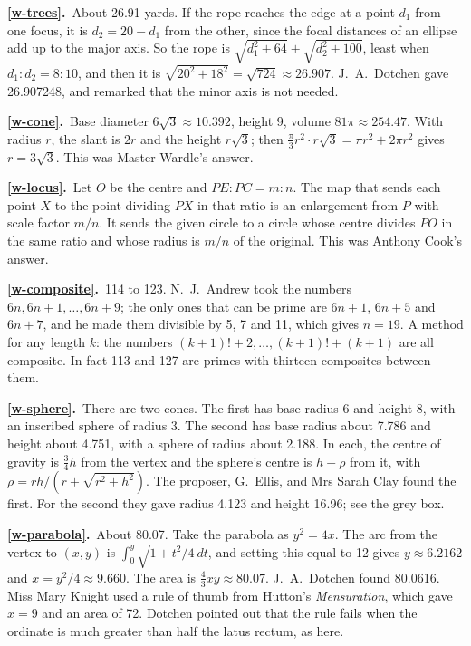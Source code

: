 \documentclass[11pt,a4paper]{article}
\newcommand{\ans}[2]{\par\smallskip\noindent\textbf{\ref{#1}.}\ #2}
\begin{document}
\ans{w-trees}{About 26.91 yards. If the rope reaches the edge at a point $d_1$ from one
focus, it is $d_2 = 20 - d_1$ from the other, since the focal distances of an ellipse add
up to the major axis. So the rope is $\sqrt{d_1^2 + 64} + \sqrt{d_2^2 + 100}$, least when
$d_1 : d_2 = 8 : 10$, and then it is $\sqrt{20^2 + 18^2} = \sqrt{724} \approx 26.907$.
J.~A.~Dotchen gave 26.907248, and remarked that the minor axis is not needed.}

\ans{w-cone}{Base diameter $6\sqrt3 \approx 10.392$, height 9, volume
$81\pi \approx 254.47$. With radius $r$, the slant is $2r$ and the height $r\sqrt3$; then
$\tfrac\pi3r^2\cdot r\sqrt3 = \pi r^2 + 2\pi r^2$ gives $r = 3\sqrt3$. This was Master
Wardle's answer.}

\ans{w-locus}{Let $O$ be the centre and $PE : PC = m : n$. The map that sends each point $X$
to the point dividing $PX$ in that ratio is an enlargement from $P$ with scale factor
$m/n$. It sends the given circle to a circle whose centre divides $PO$ in the same ratio
and whose radius is $m/n$ of the original. This was Anthony Cook's answer.}

\ans{w-composite}{114 to 123. N.~J.~Andrew took the numbers $6n, 6n+1, \dots, 6n+9$; the
only ones that can be prime are $6n+1$, $6n+5$ and $6n+7$, and he made them divisible by
5, 7 and 11, which gives $n = 19$. A method for any length $k$: the numbers
$(k+1)! + 2, \dots, (k+1)! + (k+1)$ are all composite. In fact 113 and 127 are primes with
thirteen composites between them.}

\ans{w-sphere}{There are two cones. The first has base radius 6 and height 8, with an
inscribed sphere of radius 3. The second has base radius about 7.786 and height about
4.751, with a sphere of radius about 2.188. In each, the centre of gravity is $\tfrac34h$
from the vertex and the sphere's centre is $h - \rho$ from it, with
$\rho = rh/(r + \sqrt{r^2+h^2})$. The proposer, G.~Ellis, and Mrs Sarah Clay found the
first. For the second they gave radius 4.123 and height 16.96; see the grey box.}

\ans{w-parabola}{About 80.07. Take the parabola as $y^2 = 4x$. The arc from the vertex to
$(x, y)$ is $\int_0^y\sqrt{1 + t^2/4}\,dt$, and setting this equal to 12 gives
$y \approx 6.2162$ and $x = y^2/4 \approx 9.660$. The area is $\tfrac43xy \approx 80.07$.
J.~A.~Dotchen found 80.0616. Miss Mary Knight used a rule of thumb from Hutton's
\textit{Mensuration}, which gave $x = 9$ and an area of 72. Dotchen pointed out that the
rule fails when the ordinate is much greater than half the latus rectum, as here.}
\end{document}
